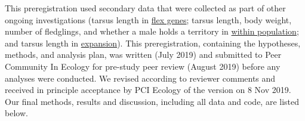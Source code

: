 \documentclass[
]{article}
\begin{document}
This preregistration used secondary data that were collected as part of
other ongoing investigations (tarsus length in
\href{http://corinalogan.com/Preregistrations/g_flexgenes.html}{flex
genes}; tarsus length, body weight, number of fledglings, and whether a
male holds a territory in
\href{http://corinalogan.com/Preregistrations/g_withinpop.html}{within
population}; and tarsus length in
\href{http://corinalogan.com/Preregistrations/g_expansion.html}{expansion}).
This preregistration, containing the hypotheses, methods, and analysis
plan, was written (July 2019) and submitted to Peer Community In Ecology
for pre-study peer review (August 2019) before any analyses were
conducted. We revised according to reviewer comments and received in
principle acceptance by PCI Ecology of the version on 8 Nov 2019. Our
final methods, results and discussion, including all data and code, are
listed below.
\end{document}
